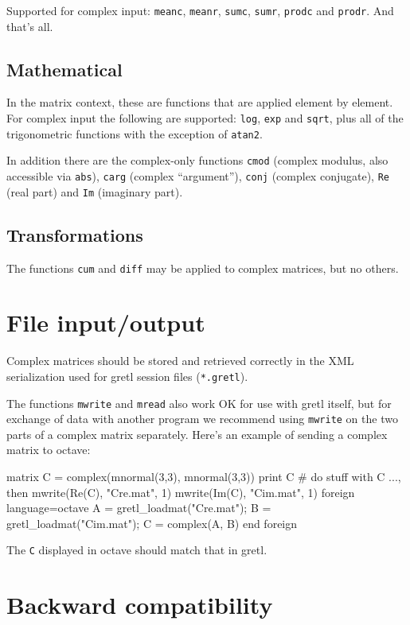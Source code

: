 \documentclass{article}
\begin{document}
Supported for complex input: \texttt{meanc}, \texttt{meanr},
\texttt{sumc}, \texttt{sumr}, \texttt{prodc} and \texttt{prodr}. And
that's all.

\subsection{Mathematical}

In the matrix context, these are functions that are applied element by
element. For complex input the following are supported: \texttt{log},
\texttt{exp} and \texttt{sqrt}, plus all of the trigonometric
functions with the exception of \texttt{atan2}.

In addition there are the complex-only functions \texttt{cmod}
(complex modulus, also accessible via \texttt{abs}), \texttt{carg}
(complex ``argument''), \texttt{conj} (complex conjugate), \texttt{Re}
(real part) and \texttt{Im} (imaginary part).

\subsection{Transformations}

The functions \texttt{cum} and \texttt{diff} may be applied to complex
matrices, but no others.

\section{File input/output}

Complex matrices should be stored and retrieved correctly in the
XML serialization used for gretl session files (\texttt{*.gretl}).

The functions \texttt{mwrite} and \texttt{mread} also work OK for use
with gretl itself, but for exchange of data with another program we
recommend using \texttt{mwrite} on the two parts of a complex matrix
separately. Here's an example of sending a complex matrix to
\textsf{octave}:
\begin{code}
matrix C = complex(mnormal(3,3), mnormal(3,3))
print C
# do stuff with C ..., then
mwrite(Re(C), "Cre.mat", 1)
mwrite(Im(C), "Cim.mat", 1)
foreign language=octave
  A = gretl_loadmat("Cre.mat");
  B = gretl_loadmat("Cim.mat");
  C = complex(A, B)
end foreign
\end{code}
The \texttt{C} displayed in octave should match that in gretl.

\section{Backward compatibility}
\label{sec:compat}
\end{document}
